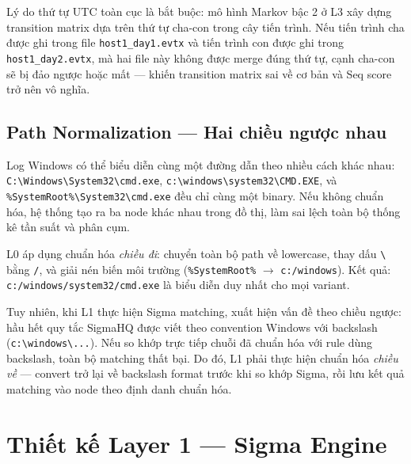 \documentclass[../main.tex]{subfiles}
\begin{document}
Lý do thứ tự UTC toàn cục là bắt buộc: mô hình Markov bậc 2 ở L3 xây dựng transition matrix dựa trên thứ tự cha-con trong cây tiến trình. Nếu tiến trình cha được ghi trong file \texttt{host1\_day1.evtx} và tiến trình con được ghi trong \texttt{host1\_day2.evtx}, mà hai file này không được merge đúng thứ tự, cạnh cha-con sẽ bị đảo ngược hoặc mất — khiến transition matrix sai về cơ bản và Seq score trở nên vô nghĩa.

\subsection{Path Normalization — Hai chiều ngược nhau}
\label{subsection:3.3.2}

Log Windows có thể biểu diễn cùng một đường dẫn theo nhiều cách khác nhau: \texttt{C:\textbackslash Windows\textbackslash System32\textbackslash cmd.exe}, \texttt{c:\textbackslash windows\textbackslash system32\textbackslash CMD.EXE}, và \texttt{\%SystemRoot\%\textbackslash System32\textbackslash cmd.exe} đều chỉ cùng một binary. Nếu không chuẩn hóa, hệ thống tạo ra ba node khác nhau trong đồ thị, làm sai lệch toàn bộ thống kê tần suất và phân cụm.

L0 áp dụng chuẩn hóa \textit{chiều đi}: chuyển toàn bộ path về lowercase, thay dấu \texttt{\textbackslash} bằng \texttt{/}, và giải nén biến môi trường (\texttt{\%SystemRoot\%} $\to$ \texttt{c:/windows}). Kết quả: \texttt{c:/windows/system32/cmd.exe} là biểu diễn duy nhất cho mọi variant.

Tuy nhiên, khi L1 thực hiện Sigma matching, xuất hiện vấn đề theo chiều ngược: hầu hết quy tắc SigmaHQ được viết theo convention Windows với backslash (\texttt{c:\textbackslash windows\textbackslash...}). Nếu so khớp trực tiếp chuỗi đã chuẩn hóa với rule dùng backslash, toàn bộ matching thất bại. Do đó, L1 phải thực hiện chuẩn hóa \textit{chiều về} — convert trở lại về backslash format trước khi so khớp Sigma, rồi lưu kết quả matching vào node theo định danh chuẩn hóa.

\section{Thiết kế Layer 1 — Sigma Engine}
\label{section:3.4}

\end{document}
